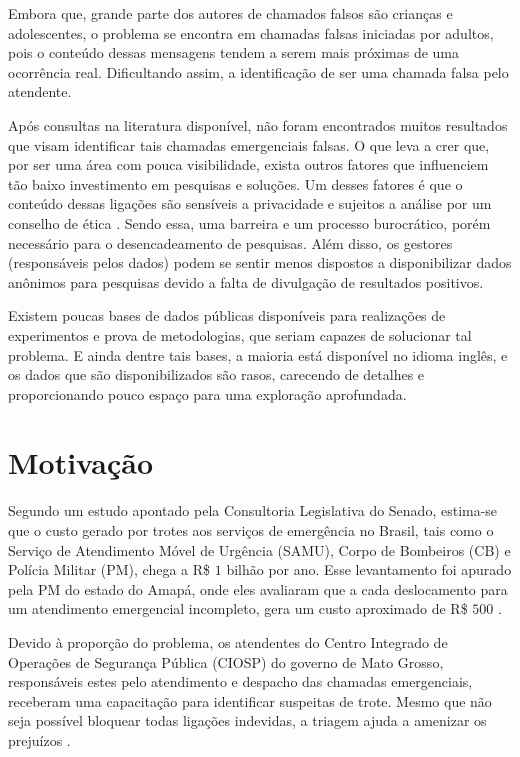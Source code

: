 Embora que, grande parte dos autores de chamados falsos são crianças e adolescentes, o problema se encontra em chamadas falsas iniciadas por adultos, pois o conteúdo dessas mensagens tendem a serem mais próximas de uma ocorrência real. Dificultando assim, a identificação de ser uma chamada falsa pelo atendente.

Após consultas na literatura disponível, não foram encontrados muitos resultados que visam identificar tais chamadas emergenciais falsas. O que leva a crer que, por ser uma área com pouca visibilidade, exista outros fatores que influenciem tão baixo investimento em pesquisas e soluções. Um desses fatores é que o conteúdo dessas ligações são sensíveis a privacidade e sujeitos a análise por um conselho de ética \citep{francisconi1998aspectos}. Sendo essa, uma barreira e um processo burocrático, porém necessário para o desencadeamento de pesquisas. Além disso, os gestores (responsáveis pelos dados) podem se sentir menos dispostos a disponibilizar dados anônimos para pesquisas devido a falta de divulgação de resultados positivos.

Existem poucas bases de dados públicas disponíveis para realizações de experimentos e prova de metodologias, que seriam capazes de solucionar tal problema. E ainda dentre tais bases, a maioria está disponível no idioma inglês, e os dados que são disponibilizados são rasos, carecendo de detalhes e proporcionando pouco espaço para uma exploração aprofundada.

\section{Motivação}
Segundo um estudo apontado pela Consultoria Legislativa do Senado, estima-se que o custo gerado por trotes aos serviços de emergência no Brasil, tais como o Serviço de Atendimento Móvel de Urgência (SAMU), Corpo de Bombeiros (CB) e Polícia Militar (PM), chega a R\$ $1$ bilhão por ano. Esse levantamento foi apurado pela PM do estado do Amapá, onde eles avaliaram que a cada deslocamento para um atendimento emergencial incompleto, gera um custo aproximado de R\$ $500$ \citep{globo2014trotes, peixoto2015combate}.

Devido à proporção do problema, os atendentes do Centro Integrado de Operações de Segurança Pública (CIOSP) do governo de Mato Grosso, responsáveis estes pelo atendimento e despacho das chamadas emergenciais, receberam uma capacitação para identificar suspeitas de trote. Mesmo que não seja possível bloquear todas ligações indevidas, a triagem ajuda a amenizar os prejuízos \citep{govMatoGrosso2016}.

